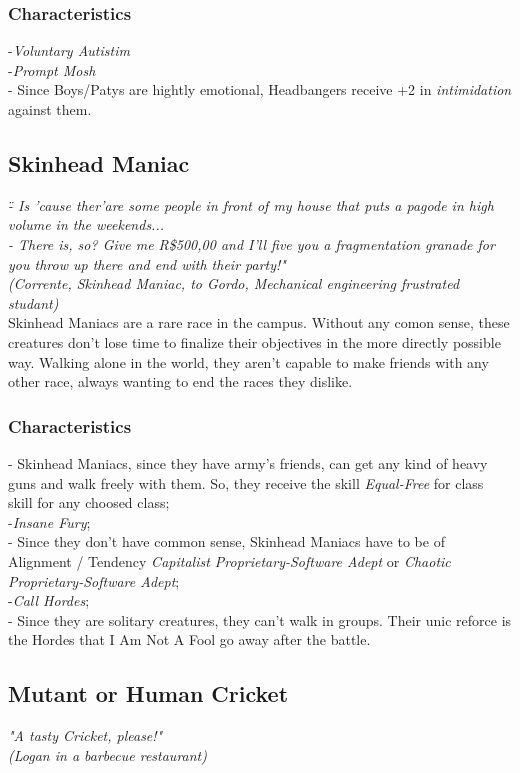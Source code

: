 \documentclass[ letterpaper,12pt]{article}
\begin{document}
\subsubsection{Characteristics}
-{\it Voluntary Autistim}\\
-{\it Prompt Mosh}\\
- Since Boys/Patys are hightly emotional, Headbangers receive +2 in {\it intimidation} against them.

\subsection{Skinhead Maniac}
{\it \" - Is 'cause ther'are some people in front of my house that puts a pagode in high volume in the weekends...\\
 - There is, so? Give me R\$500,00 and I'll five you a fragmentation granade for you throw up there and end with their party!"\\
(Corrente, Skinhead Maniac, to Gordo, Mechanical engineering frustrated studant)}\\

Skinhead Maniacs are a rare race in the campus. Without any comon sense, these creatures don't lose time to finalize their objectives in the more directly possible way. Walking alone in the world, they aren't capable to make friends with any other race, always wanting to end the races they dislike.

\subsubsection{Characteristics}
- Skinhead Maniacs, since they have army's friends, can get any kind of heavy guns and walk freely with them. So, they receive the skill {\it Equal-Free} for class skill for any choosed class;\\
-{\it Insane Fury};\\
- Since they don't have common sense, Skinhead Maniacs have to be of Alignment / Tendency {\it Capitalist Proprietary-Software Adept} or {\it Chaotic Proprietary-Software Adept};\\
-{\it Call Hordes};\\
- Since they are solitary creatures, they can't walk in groups. Their unic reforce is the Hordes that I Am Not A Fool go away after the battle.

\subsection{Mutant or Human Cricket}
{\it "A tasty Cricket, please!"\\
(Logan in a barbecue restaurant)}\\
\end{document}
